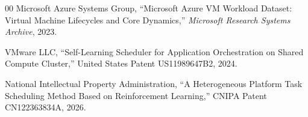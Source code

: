 \documentclass[journal]{IEEEtran}
\begin{document}
\begin{thebibliography}{00}
Microsoft Azure Systems Group, ``Microsoft Azure VM Workload Dataset: Virtual Machine Lifecycles and Core Dynamics,'' \emph{Microsoft Research Systems Archive}, 2023.

VMware LLC, ``Self-Learning Scheduler for Application Orchestration on Shared Compute Cluster,'' United States Patent US11989647B2, 2024.

National Intellectual Property Administration, ``A Heterogeneous Platform Task Scheduling Method Based on Reinforcement Learning,'' CNIPA Patent CN122363834A, 2026.

\end{thebibliography}
\end{document}
